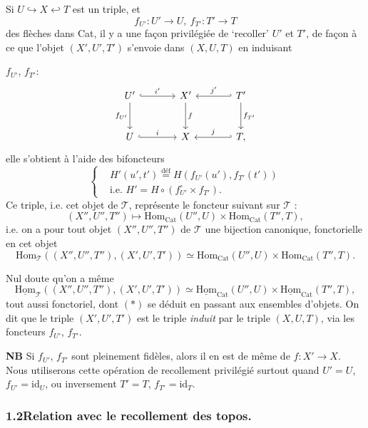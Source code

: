\documentclass[11pt]{article}
\newcommand{\printedpage}[1]{\marginpar{\footnotesize p.~#1}}
\newcommand{\msp}[1]{\marginpar{\footnotesize [#1]}}
\newcommand{\uHom}{\underline{\mathrm{Hom}}}
\begin{document}
Si $U \hookrightarrow X \hookleftarrow T$ est un triple, et
\[
f_{U'} : U' \longrightarrow U,\ f_{T'} : T' \longrightarrow T
\]
des flèches dans Cat, il y a une façon privilégiée de `recoller' $U'$ et $T'$, de façon à ce que l'objet $(X',U',T')$ s'envoie dans $(X,U,T)$ en induisant

\msp{page 61}

$f_{U'}$, $f_{T'}$:
\[
\begin{tikzcd}[column sep=large, row sep=large]
U' \arrow[r, hook, "i'"] \arrow[d, "f_{U'}"'] & X' \arrow[d, "f"] & T' \arrow[l, hook', "j'"'] \arrow[d, "f_{T'}"] \\
U \arrow[r, hook, "i"] & X & T, \arrow[l, hook', "j"']
\end{tikzcd}
\]
elle s'obtient à l'aide des bifoncteurs
\[
\left\{\begin{aligned}
&H'(u',t') \overset{\text{déf}}{=} H(f_{U'}(u'), f_{T'}(t'))\\
&\text{i.e. } H' = H \circ (f_{U'}^\circ \times f_{T'}).
\end{aligned}\right.
\]
Ce triple, i.e. cet objet de $\mathcal{T}$, représente le foncteur suivant sur $\mathcal{T}$ :
\[
(X'',U'',T'') \longmapsto \mathrm{Hom}_{\mathrm{Cat}}(U'',U) \times \mathrm{Hom}_{\mathrm{Cat}}(T'',T),
\]
i.e. on a pour tout objet $(X'',U'',T'')$ de $\mathcal{T}$ une bijection canonique, fonctorielle en cet objet
\[
\mathrm{Hom}_{\mathcal{T}}((X'',U'',T''),(X',U',T')) \simeq \mathrm{Hom}_{\mathrm{Cat}}(U'',U) \times \mathrm{Hom}_{\mathrm{Cat}}(T'',T). \tag*{$(*)$}
\]

\printedpage{45}

Nul doute qu'on a même
\[
\uHom_{\mathcal{T}}((X'',U'',T''),(X',U',T')) \simeq \uHom_{\mathrm{Cat}}(U'',U) \times \uHom_{\mathrm{Cat}}(T'',T), \tag*{$(**)$}
\]
tout aussi fonctoriel, dont $(*)$ se déduit en passant aux ensembles d'objets. On dit que le triple $(X',U',T')$ est le triple \textit{induit} par le triple $(X,U,T)$, via les foncteurs $f_{U'}$, $f_{T'}$.

\textbf{NB} Si $f_{U'}$, $f_{T'}$ sont pleinement fidèles, alors il en est de même de $f : X' \longrightarrow X$. Nous utiliserons cette opération de recollement privilégié surtout quand $U' = U$, $f_{U'} = \mathrm{id}_U$, ou inversement $T' = T$, $f_{T'} = \mathrm{id}_T$.

\subsubsection*{1.2\quad Relation avec le recollement des topos.}
\end{document}
